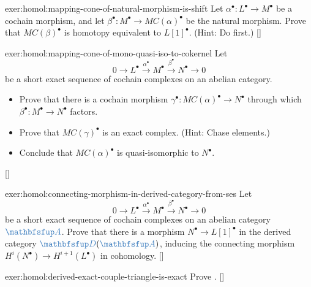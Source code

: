 \begin{exer}{\exerused{}}{exer:homol:mapping-cone-of-natural-morphism-is-shift}
  Let $\alpha^\bullet : L^\bullet \to M^\bullet$ be a cochain
  morphism, and let $\beta^\bullet : M^\bullet \to MC(\alpha)^\bullet$
  be the natural morphism. Prove that $MC(\beta)^\bullet$ is homotopy
  equivalent to $L[1]^\bullet$. (Hint: Do
  first.) []
\end{exer}

\begin{exer}{\exerused{}}{exer:homol:mapping-cone-of-mono-quasi-iso-to-cokernel}
  Let
  \[
    0 \longrightarrow L^\bullet \xrightarrow{\alpha^\bullet} M^\bullet
    \xrightarrow{\beta^\bullet} N^\bullet \longrightarrow 0
  \]
  be a short exact sequence of cochain complexes on an abelian
  category.
  \begin{itemize}
  \item Prove that there is a cochain morphism
    $\gamma^\bullet : MC(\alpha)^\bullet \to N^\bullet$ through which
    $\beta^\bullet : M^\bullet \to N^\bullet$ factors.
  \item Prove that $MC(\gamma)^\bullet$ is an exact complex. (Hint:
    Chase elements.)
  \item Conclude that $MC(\alpha)^\bullet$ is quasi-isomorphic to
    $N^\bullet$.
  \end{itemize} []
\end{exer}

\begin{exer}{\exerused{}}{exer:homol:connecting-morphism-in-derived-category-from-ses}
  Let
  \[
    0 \longrightarrow L^\bullet \xrightarrow{\alpha^\bullet} M^\bullet
    \xrightarrow{\beta^\bullet} N^\bullet \longrightarrow 0
  \]
  be a short exact sequence of cochain complexes on an abelian
  category $\categ{A}$. Prove that there is a morphism
  $N^\bullet \to L[1]^\bullet$ in the derived category
  $\categ{D}(\categ{A})$, inducing the connecting morphism
  $H^i(N^\bullet) \to H^{i+1}(L^\bullet)$ in
  cohomology. []
\end{exer}

\begin{exer}{\exerused{}}{exer:homol:derived-exact-couple-triangle-is-exact}
  Prove
  . []
\end{exer}

